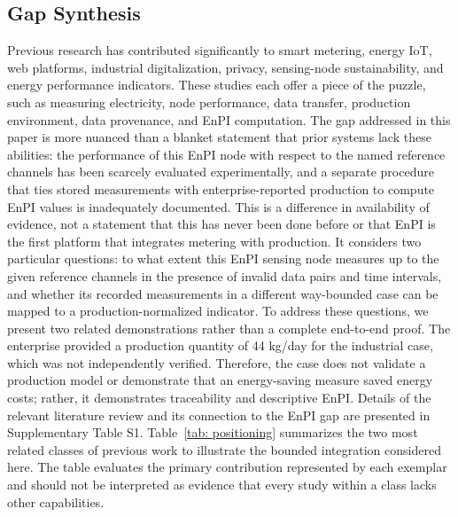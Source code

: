 \documentclass[technologies,article,submit,pdftex,moreauthors]{Definitions/mdpi}
\begin{document}
\subsection{Gap Synthesis}
\label{subsec:gap-synthesis}
Previous research has contributed significantly to smart metering, energy IoT, web platforms, industrial digitalization, privacy, sensing-node sustainability, and energy performance indicators. These studies each offer a piece of the puzzle, such as measuring electricity, node performance, data transfer, production environment, data provenance, and EnPI computation. The gap addressed in this paper is more nuanced than a blanket statement that prior systems lack these abilities: the performance of this EnPI node with respect to the named reference channels has been scarcely evaluated experimentally, and a separate procedure that ties stored measurements with enterprise-reported production to compute EnPI values is inadequately documented. This is a difference in availability of evidence, not a statement that this has never been done before or that EnPI is the first platform that integrates metering with production. It considers two particular questions: to what extent this EnPI sensing node measures up to the given reference channels in the presence of invalid data pairs and time intervals, and whether its recorded measurements in a different way-bounded case can be mapped to a production-normalized indicator. To address these questions, we present two related demonstrations rather than a complete end-to-end proof. The enterprise provided a production quantity of 44 kg/day for the industrial case, which was not independently verified. Therefore, the case does not validate a production model or demonstrate that an energy-saving measure saved energy costs; rather, it demonstrates traceability and descriptive EnPI. Details of the relevant literature review and its connection to the EnPI gap are presented in Supplementary Table S1. Table~\ref {tab: positioning} summarizes the two most related classes of previous work to illustrate the bounded integration considered here. The table evaluates the primary contribution represented by each exemplar and should not be interpreted as evidence that every study within a class lacks other capabilities.
\end{document}
